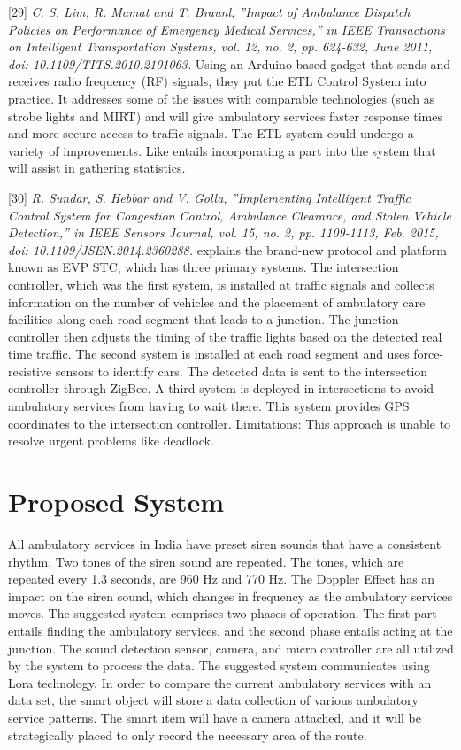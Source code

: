 \documentclass[conference]{IEEEtran}
\begin{document}
[29]\emph{ C. S. Lim, R. Mamat and T. Braunl, ”Impact of
Ambulance Dispatch Policies on Performance of Emergency
Medical Services,” in IEEE Transactions on Intelligent Transportation Systems, vol. 12, no. 2, pp. 624-632, June 2011, doi:
10.1109/TITS.2010.2101063. }
Using an Arduino-based gadget that sends and receives radio frequency (RF) signals, they put the ETL Control System into practice. It addresses some of the issues with comparable technologies (such as strobe lights and MIRT) and will give ambulatory services faster response times and more secure access to traffic signals. The ETL system could undergo a variety of improvements. Like entails incorporating a part into the system that will assist in gathering statistics.

[30]\emph{ R. Sundar, S. Hebbar and V. Golla, ”Implementing
Intelligent Traffic Control System for Congestion Control,
Ambulance Clearance, and Stolen Vehicle Detection,” in IEEE
Sensors Journal, vol. 15, no. 2, pp. 1109-1113, Feb. 2015, doi:
10.1109/JSEN.2014.2360288.
 }
explains the brand-new protocol and platform known as EVP STC, which has three primary systems. The intersection controller, which was the first system, is installed at traffic signals and collects information on the number of vehicles and the placement of ambulatory care facilities along each road segment that leads to a junction. The junction controller then adjusts the timing of the traffic lights based on the detected real time traffic. The second system is installed at each road segment and uses force-resistive sensors to identify cars. The detected data is sent to the intersection controller through ZigBee. A third system is deployed in intersections to avoid ambulatory services from having to wait there. This system provides GPS coordinates to the intersection controller.
Limitations: This approach is unable to resolve urgent problems like deadlock.


\section{Proposed System}
All ambulatory services in India have preset siren sounds that have a consistent rhythm. Two tones of the siren sound are repeated. The tones, which are repeated every 1.3 seconds, are 960 Hz and 770 Hz. The Doppler Effect has an impact on the siren sound, which changes in frequency as the ambulatory services moves. The suggested system comprises two phases of operation. The first part entails finding the ambulatory services, and the second phase entails acting at the junction. The sound detection sensor, camera, and micro controller are all utilized by the system to process the data. The suggested system communicates using Lora technology. In order to compare the current ambulatory services with an data set, the smart object will store a data collection of various ambulatory service patterns. The smart item will have a camera attached, and it will be strategically placed to only record the necessary area of the route. 
\end{document}

